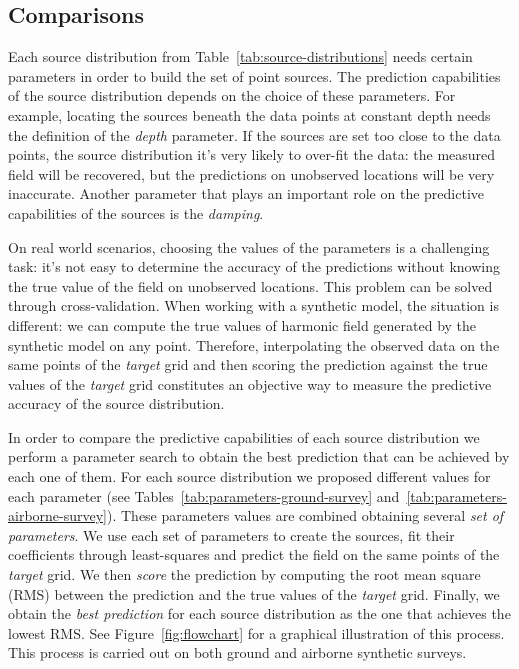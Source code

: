 \documentclass[twocolumn]{article}
\begin{document}
\subsection{Comparisons}

Each source distribution from Table~\ref{tab:source-distributions} needs
certain parameters in order to build the set of point sources.
The prediction capabilities of the source distribution depends on the choice of
these parameters.
For example, locating the sources beneath the data points at constant depth
needs the definition of the \emph{depth} parameter.
If the sources are set too close to the data points, the source distribution
it's very likely to over-fit the data: the measured field will be recovered, but
the predictions on unobserved locations will be very inaccurate.
Another parameter that plays an important role on the predictive capabilities
of the sources is the \emph{damping}.

On real world scenarios, choosing the values of the parameters is a challenging
task: it's not easy to determine the accuracy of the predictions without
knowing the true value of the field on unobserved locations.
This problem can be solved through cross-validation.
When working with a synthetic model, the situation is different: we can compute
the true values of harmonic field generated by the synthetic model on any
point.
Therefore, interpolating the observed data on the same points of the
\emph{target} grid and then scoring the prediction against the true values of
the \emph{target} grid constitutes an objective way to measure the predictive
accuracy of the source distribution.

In order to compare the predictive capabilities of each source distribution we
perform a parameter search to obtain the best prediction that can be achieved
by each one of them.
For each source distribution we proposed different values for each parameter
(see Tables~\ref{tab:parameters-ground-survey}
and~\ref{tab:parameters-airborne-survey}).
These parameters values are combined obtaining several \emph{set of
parameters}.
We use each set of parameters to create the sources, fit their coefficients
through least-squares and predict the field on the same points of the
\emph{target} grid.
We then \emph{score} the prediction by computing the root mean square (RMS)
between the prediction and the true values of the \emph{target} grid.
Finally, we obtain the \emph{best prediction} for each source distribution as
the one that achieves the lowest RMS.
See Figure~\ref{fig:flowchart} for a graphical illustration of this process.
This process is carried out on both ground and airborne synthetic surveys.
\end{document}
